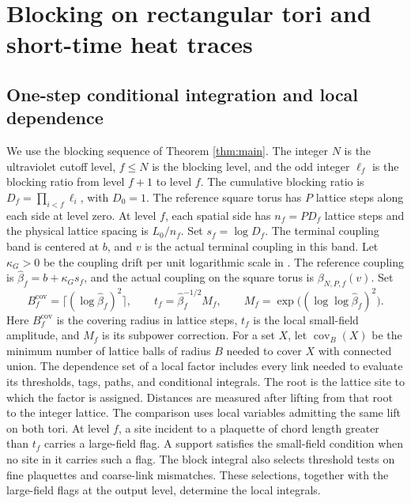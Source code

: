 \documentclass[11pt,a4paper]{article}
\numberwithin{equation}{section}
\begin{document}
\section{Blocking on rectangular tori and short-time heat traces}
\label{app:geometry}

\subsection{One-step conditional integration and local dependence}
\label{lem:geometry-local}

We use the blocking sequence of Theorem \ref{thm:main}. The integer \(N\) is the ultraviolet cutoff level, \(f\le N\) is the blocking level, and the odd integer \(\ell_f\) is the blocking ratio from level \(f+1\) to level \(f\). The cumulative blocking ratio is \(D_f=\prod_{i<f}\ell_i\), with \(D_0=1\). The reference square torus has \(P\) lattice steps along each side at level zero. At level \(f\), each spatial side has \(n_f=P D_f\) lattice steps and the physical lattice spacing is \(L_0/n_f\). Set \(s_f=\log D_f\). The terminal coupling band is centered at \(b\), and \(v\) is the actual terminal coupling in this band. Let \(\kappa_G>0\) be the coupling drift per unit logarithmic scale in \cite{armstrong}. The reference coupling is \(\widehat\beta_f=b+\kappa_Gs_f\), and the actual coupling on the square torus is \(\beta_{N,P,f}(v)\). Set
\[
 B_f^{\mathrm{cov}}=\lceil(\log\widehat\beta_f)^2\rceil,\qquad
 t_f=\widehat\beta_f^{-1/2}M_f,\qquad
 M_f=\exp\big((\log\log\widehat\beta_f)^2\big).
\]
Here \(B_f^{\mathrm{cov}}\) is the covering radius in lattice steps, \(t_f\) is the local small-field amplitude, and \(M_f\) is its subpower correction. For a set \(X\), let \(\operatorname{cov}_{B}(X)\) be the minimum number of lattice balls of radius \(B\) needed to cover \(X\) with connected union. The dependence set of a local factor includes every link needed to evaluate its thresholds, tags, paths, and conditional integrals. The root is the lattice site to which the factor is assigned. Distances are measured after lifting from that root to the integer lattice. The comparison uses local variables admitting the same lift on both tori. At level \(f\), a site incident to a plaquette of chord length greater than \(t_f\) carries a large-field flag. A support satisfies the small-field condition when no site in it carries such a flag. The block integral also selects threshold tests on fine plaquettes and coarse-link mismatches. These selections, together with the large-field flags at the output level, determine the local integrals.
\end{document}
